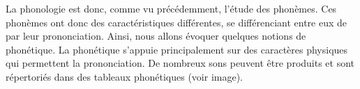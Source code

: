 \documentclass[12pt, french, twoside]{report}
\begin{document}
La phonologie est donc, comme vu précédemment, l'étude des phonèmes. Ces phonèmes ont donc des caractéristiques différentes, se différenciant entre eux de par leur prononciation. 
Ainsi, nous allons évoquer quelques notions de phonétique. La phonétique s'appuie principalement sur des caractères physiques qui permettent la prononciation. De nombreux sons peuvent être produits et sont répertoriés dans des tableaux phonétiques \cite{Saussure} (voir image). 
\end{document}
